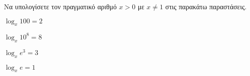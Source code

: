 Να υπολογίσετε τον πραγματικό αριθμό $ x>0$ με $ x\neq 1 $ στις παρακάτω παραστάσεις.
\begin{multicols}{2}
\begin{rlist}
\item $ \log_{x}{100}=2 $
\item $ \log_{x}{10^8}=8 $
\item $ \log_{x}{e^3}=3 $
\item $ \log_{x}{e}=1 $
\end{rlist}
\end{multicols}
